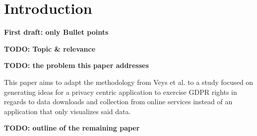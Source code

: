 \section{Introduction}
\label{intro}

\textbf{First draft: only Bullet points}

\textbf{TODO: Topic \& relevance}

\textbf{TODO: the problem this paper addresses}

This paper aims to adapt the methodology from Veys et al. \cite{Veys2021} to a study focused on generating ideas for a privacy centric application to exercise GDPR rights in regards to data downloads and collection from online services instead of an application that only visualizes said data.

\textbf{TODO: outline of the remaining paper}
